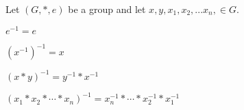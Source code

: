   Let $(G, *, e)$ be a group and 
  let $x, y, x_1, x_2, ...x_n, \in G$.
  \begin{myenum}
    \item $e^{-1} = e$
    \item $(x^{-1})^{-1} = x$ 
    \item $(x * y)^{-1} = y^{-1} * x^{-1}$
    \item $(x_1 * x_2 * \cdots * x_n)^{-1} = x_n^{-1} * \cdots * x_2^{-1} * x_1^{-1}$
  \end{myenum}

